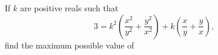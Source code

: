 If   $k$ are positive reals such that \[3=k^2\left(\dfrac{x^2}{y^2}+\dfrac{y^2}{x^2}\right)+k\left(\dfrac{x}{y}+\dfrac{y}{x}\right),\] find the maximum possible value of 